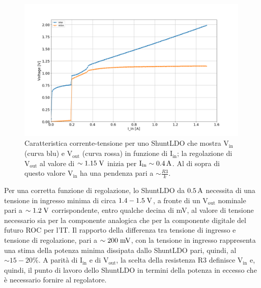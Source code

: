 \begin{figure}[!htbp]
\centering
\includegraphics[width=0.99\textwidth]{Immagini/CaratteristicaSLDO.png}
\caption{Caratteristica corrente-tensione per uno ShuntLDO che mostra $\mathrm{V_{in}}$ (curva blu) e $\mathrm{V_{out}}$ (curva rossa) in funzione di $\mathrm{I_{in}}$; la regolazione di  $\mathrm{V_{out}}$ al valore di $\sim 1.15\rm \; V$ inizia per $\mathrm{I_{in}}\sim0.4\rm \, A$. Al di sopra di questo valore $\mathrm{V_{in}}$ ha una pendenza pari a $\sim\frac{R3}{k}$.}
\label{fig:IVSLDO}
\end{figure}

Per una corretta funzione di regolazione, lo ShuntLDO da $0.5\rm \, A$ necessita di una tensione in ingresso minima di circa $1.4-1.5\rm \; V$, a fronte di un $\mathrm{V_{out}}$ nominale pari a $\sim 1.2\rm \; V$ corrispondente, entro qualche decina di mV, al valore di tensione necessario sia per la componente analogica che per la componente digitale del futuro ROC per l'IT. Il rapporto della differenza tra tensione di ingresso e tensione di regolazione, pari a $\sim 200\rm \; mV$, con la tensione in ingresso rappresenta una stima della potenza minima dissipata dallo ShuntLDO pari, quindi, al $\sim 15-20\%$. A parit\`a di $\mathrm{I_{in}}$ e di $\mathrm{V_{out}}$, la scelta della resistenza R3 definisce $\mathrm{V_{in}}$ e, quindi, il punto di lavoro dello ShuntLDO in termini della potenza in eccesso che \`e necessario fornire al regolatore.
\FloatBarrier


